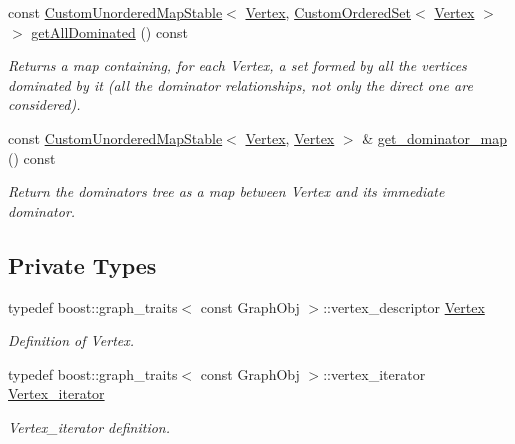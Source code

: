 \begin{DoxyCompactItemize}
const \hyperlink{custom__map_8hpp_a7314a7df1cdb3a3acf478ab86e95c226}{Custom\+Unordered\+Map\+Stable}$<$ \hyperlink{classdominance_acc73faf26e73171b15fd0ff6c63ca393}{Vertex}, \hyperlink{classCustomOrderedSet}{Custom\+Ordered\+Set}$<$ \hyperlink{classdominance_acc73faf26e73171b15fd0ff6c63ca393}{Vertex} $>$ $>$ \hyperlink{classdominance_a806e173d4c1bc8dea71e9b24d5868856}{get\+All\+Dominated} () const
\begin{DoxyCompactList}\small\item\em Returns a map containing, for each Vertex, a set formed by all the vertices dominated by it (all the dominator relationships, not only the direct one are considered). \end{DoxyCompactList}\item 
const \hyperlink{custom__map_8hpp_a7314a7df1cdb3a3acf478ab86e95c226}{Custom\+Unordered\+Map\+Stable}$<$ \hyperlink{classdominance_acc73faf26e73171b15fd0ff6c63ca393}{Vertex}, \hyperlink{classdominance_acc73faf26e73171b15fd0ff6c63ca393}{Vertex} $>$ \& \hyperlink{classdominance_a60e3d1d880582bd53ae784da18a9a3ff}{get\+\_\+dominator\+\_\+map} () const
\begin{DoxyCompactList}\small\item\em Return the dominators tree as a map between Vertex and its immediate dominator. \end{DoxyCompactList}\end{DoxyCompactItemize}
\subsection*{Private Types}
\begin{DoxyCompactItemize}
\item 
typedef boost\+::graph\+\_\+traits$<$ const Graph\+Obj $>$\+::vertex\+\_\+descriptor \hyperlink{classdominance_acc73faf26e73171b15fd0ff6c63ca393}{Vertex}
\begin{DoxyCompactList}\small\item\em Definition of Vertex. \end{DoxyCompactList}\item 
typedef boost\+::graph\+\_\+traits$<$ const Graph\+Obj $>$\+::vertex\+\_\+iterator \hyperlink{classdominance_a0a3eefc98e49cc387674d4f3224c5213}{Vertex\+\_\+iterator}
\begin{DoxyCompactList}\small\item\em Vertex\+\_\+iterator definition. \end{DoxyCompactList}\end{DoxyCompactItemize}
